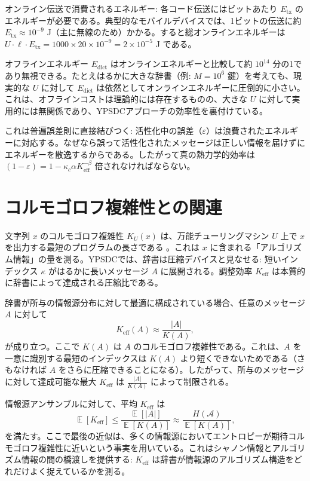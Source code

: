 \documentclass[12pt,a4paper]{article}
\theoremstyle{definition}
\theoremstyle{remark}
\newcommand{\Keff}{K_{\mathrm{eff}}}
\DeclareMathOperator{\E}{\mathbb{E}}
\begin{document}
	オンライン伝送で消費されるエネルギー: 各コード伝送にはビットあたり $E_{\text{tx}}$ のエネルギーが必要である。典型的なモバイルデバイスでは、1ビットの伝送に約 $E_{\text{tx}} \approx 10^{-9}$ J（主に無線のため）かかる。すると総オンラインエネルギーは $U \cdot \ell \cdot E_{\text{tx}} = 1000 \times 20 \times 10^{-9} = 2 \times 10^{-5}$ J である。
	
	オフラインエネルギー $E_{\text{dict}}$ はオンラインエネルギーと比較して約 $10^{14}$ 分の1であり無視できる。たとえはるかに大きな辞書（例: $M = 10^6$ 鍵）を考えても、現実的な $U$ に対して $E_{\text{dict}}$ は依然としてオンラインエネルギーに圧倒的に小さい。これは、オフラインコストは理論的には存在するものの、大きな $U$ に対して実用的には無関係であり、YPSDCアプローチの効率性を裏付けている。
	
	これは普遍誤差則に直接結びつく: 活性化中の誤差（$\varepsilon$）は浪費されたエネルギーに対応する。なぜなら誤って活性化されたメッセージは正しい情報を届けずにエネルギーを散逸するからである。したがって真の熱力学的効率は $(1-\varepsilon) = 1 - \kappa_c\alpha K_{\mathrm{eff}}^{-\beta}$ 倍されなければならない。
	
	\section{コルモゴロフ複雑性との関連}
	\label{sec:kolmogorov}
	
	文字列 $x$ のコルモゴロフ複雑性 $K_U(x)$ は、万能チューリングマシン $U$ 上で $x$ を出力する最短のプログラムの長さである \cite{Kolmogorov1965}。これは $x$ に含まれる「アルゴリズム情報」の量を測る。YPSDCでは、辞書は圧縮デバイスと見なせる: 短いインデックス $\kappa$ がはるかに長いメッセージ $A$ に展開される。調整効率 $\Keff$ は本質的に辞書によって達成される圧縮比である。
	
	辞書が所与の情報源分布に対して最適に構成されている場合、任意のメッセージ $A$ に対して
	\begin{equation}
		\Keff(A) \approx \frac{|A|}{K(A)}, \label{eq:kolmogorov}
	\end{equation}
	が成り立つ。ここで $K(A)$ は $A$ のコルモゴロフ複雑性である。これは、$A$ を一意に識別する最短のインデックスは $K(A)$ より短くできないためである（さもなければ $A$ をさらに圧縮できることになる）。したがって、所与のメッセージに対して達成可能な最大 $\Keff$ は $\frac{|A|}{K(A)}$ によって制限される。
	
	情報源アンサンブルに対して、平均 $\Keff$ は
	\begin{equation}
		\E[\Keff] \le \frac{\E[|A|]}{\E[K(A)]} \approx \frac{H(\mathcal{A})}{\E[K(A)]},
	\end{equation}
	を満たす。ここで最後の近似は、多くの情報源においてエントロピーが期待コルモゴロフ複雑性に近いという事実を用いている。これはシャノン情報とアルゴリズム情報の間の橋渡しを提供する: $\Keff$ は辞書が情報源のアルゴリズム構造をどれだけよく捉えているかを測る。
	
\end{document}
